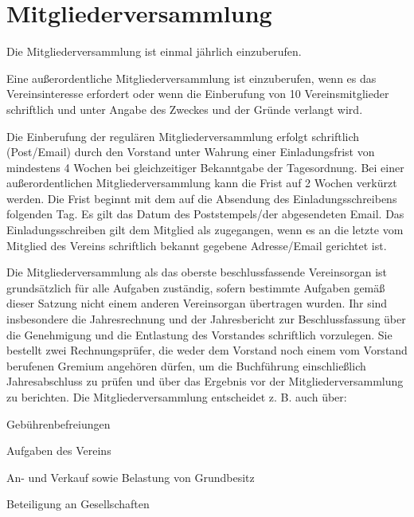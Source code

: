 \documentclass[a5paper, ngerman, 10pt]{scrreprt}
\begin{document}
\section{Mitgliederversammlung}
\begin{compactenum}[(1)]
    \item Die Mitgliederversammlung ist einmal jährlich einzuberufen.
    \item Eine außerordentliche Mitgliederversammlung ist einzuberufen, wenn es
        das Vereinsinteresse erfordert oder wenn die Einberufung von 10%
        Vereinsmitglieder schriftlich und unter Angabe des Zweckes und der
        Gründe verlangt wird.
    \item Die Einberufung der regulären Mitgliederversammlung erfolgt
        schriftlich (Post/Email) durch den Vorstand unter Wahrung einer
        Einladungsfrist von mindestens 4 Wochen bei gleichzeitiger Bekanntgabe
        der Tagesordnung. Bei einer außerordentlichen Mitgliederversammlung
        kann die Frist auf 2 Wochen verkürzt werden. Die Frist beginnt mit dem
        auf die Absendung des Einladungsschreibens folgenden Tag. Es gilt das
        Datum des Poststempels/der abgesendeten Email. Das Einladungsschreiben
        gilt dem Mitglied als zugegangen, wenn es an die letzte vom Mitglied
        des Vereins schriftlich bekannt gegebene Adresse/Email gerichtet ist.
    \item Die Mitgliederversammlung als das oberste beschlussfassende
        Vereinsorgan ist grundsätzlich für alle Aufgaben zuständig, sofern
        bestimmte Aufgaben gemäß dieser Satzung nicht einem anderen
        Vereinsorgan übertragen wurden. Ihr sind insbesondere die
        Jahresrechnung und der Jahresbericht zur Beschlussfassung über die
        Genehmigung und die Entlastung des Vorstandes schriftlich vorzulegen.
        Sie bestellt zwei Rechnungsprüfer, die weder dem Vorstand noch einem
        vom Vorstand berufenen Gremium angehören dürfen, um die Buchführung
        einschließlich Jahresabschluss zu prüfen und über das Ergebnis vor der
        Mitgliederversammlung zu berichten. Die Mitgliederversammlung
        entscheidet z. B. auch über:
    \begin{compactenum}[a.]
        \item Gebührenbefreiungen
        \item Aufgaben des Vereins
        \item An- und Verkauf sowie Belastung von Grundbesitz
        \item Beteiligung an Gesellschaften

\end{compactenum}
\end{compactenum}
\end{document}
